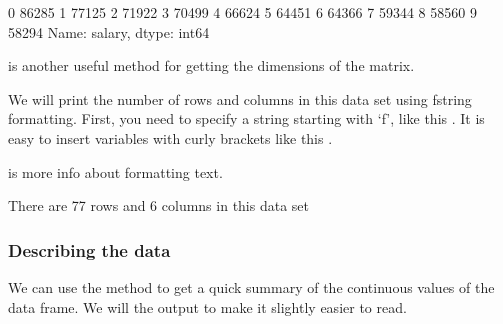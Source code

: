 \documentclass[letterpaper,10pt,english]{sphinxmanual}
\begin{document}
\begin{sphinxVerbatim}[commandchars=\\\{\}]
0    86285
1    77125
2    71922
3    70499
4    66624
5    64451
6    64366
7    59344
8    58560
9    58294
Name: salary, dtype: int64
\end{sphinxVerbatim}

 is another useful method for getting the dimensions of the matrix.

We will print the number of rows and columns in this data set using fstring formatting. First, you need to specify a string starting with ‘f’, like this . It is easy to insert variables with curly brackets like this .

 is more info about formatting text.

\begin{sphinxVerbatim}[commandchars=\\\{\}]
   
\end{sphinxVerbatim}

\begin{sphinxVerbatim}[commandchars=\\\{\}]
There are 77 rows and 6 columns in this data set
\end{sphinxVerbatim}


\subsubsection{Describing the data}
\label{\detokenize{content/Introduction_to_Pandas:describing-the-data}}
We can use the  method to get a quick summary of the continuous values of the data frame. We will  the output to make it slightly easier to read.

\begin{sphinxVerbatim}[commandchars=\\\{\}]
\end{sphinxVerbatim}
\end{document}
